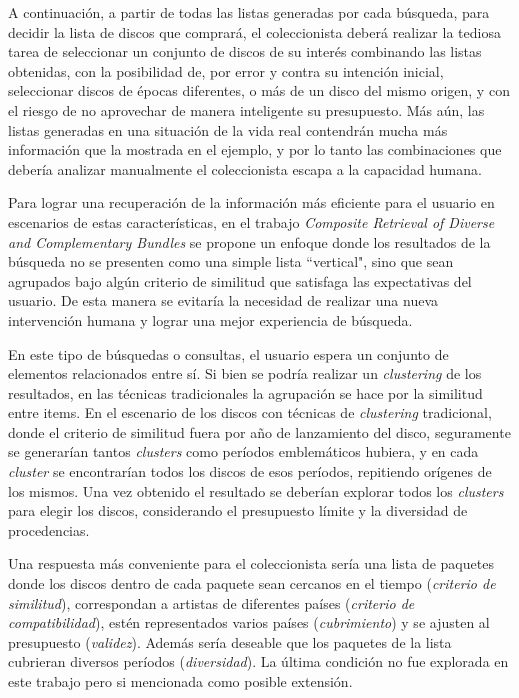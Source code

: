 A continuación, a partir de todas las listas generadas por cada búsqueda, para decidir la lista de discos que comprará, el coleccionista deberá realizar la tediosa tarea de seleccionar un conjunto de discos de su interés combinando las listas obtenidas, con la posibilidad de, por error y contra su intención inicial, seleccionar discos de  épocas diferentes, o más de un disco del mismo origen, y con el riesgo de no aprovechar de manera inteligente su presupuesto. Más aún, las listas generadas en una situación de la vida real contendrán mucha más información que la mostrada en el ejemplo, y por lo tanto las combinaciones que debería analizar manualmente el coleccionista escapa a la capacidad humana. 

Para lograr una recuperación de la información más eficiente para el usuario en escenarios de estas características, en el trabajo {\em Composite Retrieval of Diverse and Complementary Bundles} \cite{compositeRetrival} se propone un enfoque donde los resultados de la búsqueda no se presenten como una simple lista ``vertical", sino que sean agrupados bajo algún criterio de similitud que satisfaga las expectativas del usuario. De esta manera se evitaría la necesidad de realizar una nueva intervención humana y lograr una mejor experiencia de búsqueda.

En este tipo de búsquedas o consultas, el usuario espera un conjunto de elementos relacionados entre sí. Si bien se podría realizar un {\em clustering} de los resultados, en las técnicas tradicionales la agrupación se hace por la similitud entre items. En el escenario de los discos con técnicas de {\em clustering} tradicional, donde el criterio de similitud fuera por año de lanzamiento del disco, seguramente se generarían tantos {\em clusters} como períodos emblemáticos hubiera, y en cada {\em cluster} se encontrarían todos los discos de esos períodos, repitiendo orígenes de los mismos. Una vez obtenido el resultado se deberían explorar todos los {\em clusters} para elegir los discos, considerando el presupuesto límite y la diversidad de procedencias.

Una respuesta más conveniente para el coleccionista sería una lista de paquetes donde los discos dentro de cada paquete sean cercanos en el tiempo ({\em criterio de similitud}), correspondan a artistas de diferentes países ({\em criterio de compatibilidad}), estén representados varios países ({\em cubrimiento}) y se ajusten al presupuesto ({\em validez}). Además sería deseable que los paquetes de la lista cubrieran diversos períodos ({\em diversidad}). La última condición no fue explorada en este trabajo pero si mencionada como posible extensión.

